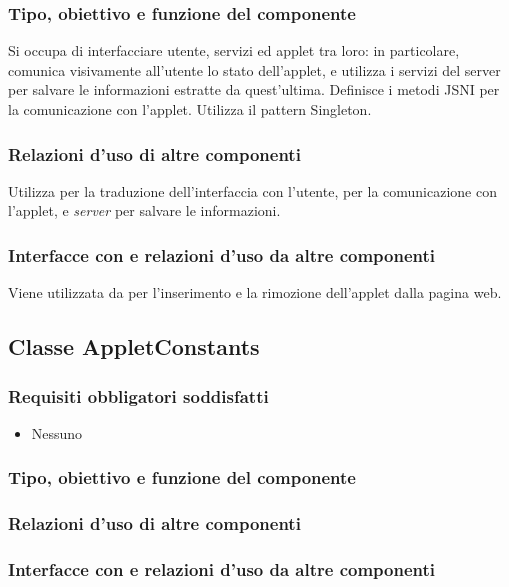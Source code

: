 \subsubsection*{Tipo, obiettivo e funzione del componente}
Si occupa di interfacciare utente, servizi ed applet tra loro: in particolare,
comunica visivamente all'utente lo stato dell'applet, e utilizza i servizi del
server per salvare le informazioni estratte da quest'ultima.
Definisce i metodi JSNI per la comunicazione con l'applet.
Utilizza il pattern Singleton.

\subsubsection*{Relazioni d'uso di altre componenti}
Utilizza  per la traduzione dell'interfaccia con l'utente,
 per la comunicazione con l'applet, e \emph{server} per
salvare le informazioni.

\subsubsection*{Interfacce con e relazioni d'uso da altre componenti}
Viene utilizzata da  per l'inserimento e la rimozione
dell'applet dalla pagina web.

\subsection{Classe AppletConstants}
\subsubsection*{Requisiti obbligatori soddisfatti}
\begin{itemize}
    \item Nessuno
\end{itemize}
\subsubsection*{Tipo, obiettivo e funzione del componente}
\subsubsection*{Relazioni d'uso di altre componenti}
\subsubsection*{Interfacce con e relazioni d'uso da altre componenti}
